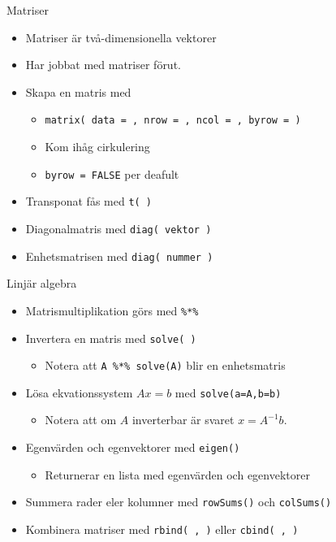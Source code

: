 \documentclass[
  11pt,
  ignorenonframetext,
  handout]{beamer}
\providecommand{\tightlist}{%
  \setlength{\itemsep}{0pt}\setlength{\parskip}{0pt}}
\begin{document}
\begin{frame}{Matriser}
\label{matriser}
\begin{itemize}
\tightlist
\item
  Matriser är två-dimensionella vektorer
\item
  Har jobbat med matriser förut.
\item
  Skapa en matris med

  \begin{itemize}
  \tightlist
  \item
    \texttt{matrix( data = , nrow = , ncol = , byrow = )}
  \item
    Kom ihåg cirkulering
  \item
    \texttt{byrow = FALSE} per deafult
  \end{itemize}
\item
  Transponat fås med \texttt{t( )}
\item
  Diagonalmatris med \texttt{diag( vektor )}
\item
  Enhetsmatrisen med \texttt{diag( nummer )}
\end{itemize}
\end{frame}

\begin{frame}{Linjär algebra}
\label{linjuxe4r-algebra-1}
\begin{itemize}
\tightlist
\item
  Matrismultiplikation görs med \texttt{\%*\%}
\item
  Invertera en matris med \texttt{solve( )}

  \begin{itemize}
  \tightlist
  \item
    Notera att \texttt{A \%*\% solve(A)} blir en enhetsmatris
  \end{itemize}
\item
  Lösa ekvationssystem \(Ax = b\) med \texttt{solve(a=A,b=b)}

  \begin{itemize}
  \tightlist
  \item
    Notera att om \(A\) inverterbar är svaret \(x = A^{-1}b\).
  \end{itemize}
\item
  Egenvärden och egenvektorer med \texttt{eigen()}

  \begin{itemize}
  \tightlist
  \item
    Returnerar en lista med egenvärden och egenvektorer
  \end{itemize}
\item
  Summera rader eler kolumner med \texttt{rowSums()} och
  \texttt{colSums()}
\item
  Kombinera matriser med \texttt{rbind( , )} eller \texttt{cbind( , )}
\end{itemize}
\end{frame}
\end{document}
